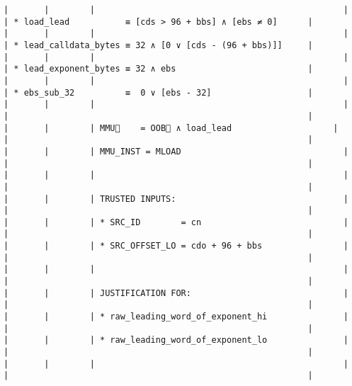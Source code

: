 \documentclass[varwidth=\maxdimen,margin=0.5cm,multi={verbatim}]{standalone}
\begin{document}
\begin{verbatim}
|       |        |                                                 |                                          | * load_lead           ≡ [cds > 96 + bbs] ∧ [ebs ≠ 0]      |
|       |        |                                                 |                                          | * lead_calldata_bytes ≡ 32 ∧ [0 ∨ [cds - (96 + bbs)]]     |
|       |        |                                                 |                                          | * lead_exponent_bytes ≡ 32 ∧ ebs                          |
|       |        |                                                 |                                          | * ebs_sub_32          ≡  0 ∨ [ebs - 32]                   |
|       |        |                                                 |                                          |                                                           |
|       |        | MMU🏴    = OOB🏴 ∧ load_lead                    |                                          |                                                           |
|       |        | MMU_INST = MLOAD                                |                                          |                                                           |
|       |        |                                                 |                                          |                                                           |
|       |        | TRUSTED INPUTS:                                 |                                          |                                                           |
|       |        | * SRC_ID        = cn                            |                                          |                                                           |
|       |        | * SRC_OFFSET_LO = cdo + 96 + bbs                |                                          |                                                           |
|       |        |                                                 |                                          |                                                           |
|       |        | JUSTIFICATION FOR:                              |                                          |                                                           |
|       |        | * raw_leading_word_of_exponent_hi               |                                          |                                                           |
|       |        | * raw_leading_word_of_exponent_lo               |                                          |                                                           |
|       |        |                                                 |                                          |                                                           |

\end{verbatim}
\end{document}
